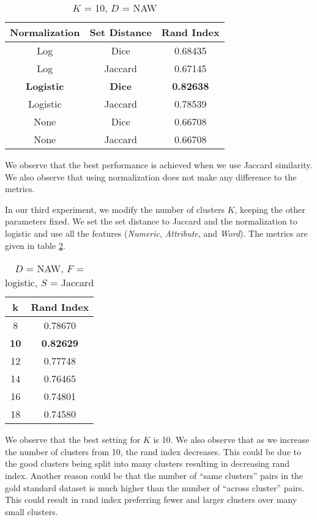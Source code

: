 \documentclass{article}
\begin{document}
\begin{table}
  \begin{center}
    \begin{tabular}{| c | c | c |}
    	\hline
       		Normalization & Set Distance & Rand Index \\
       	\hline
          Log & Dice & 0.68435 \\
          Log & Jaccard & 0.67145 \\
          \textbf{Logistic} & \textbf{Dice} & \textbf{0.82638} \\
          Logistic & Jaccard & 0.78539 \\
          None & Dice & 0.66708 \\
          None & Jaccard & 0.66708 \\
        \hline
    \end{tabular}
    \caption{$K$ = 10, $D$ = NAW}
    \label{tab:func}
  \end{center}
\end{table}

We observe that the best performance is achieved when we use Jaccard similarity.
We also observe that using normalization does not make any difference to the metrics.

In our third experiment, we modify the number of clusters $K$, keeping the other parameters fixed.
We set the set distance to Jaccard and the normalization to logistic and use all the features  (\textit{Numeric}, \textit{Attribute}, and \textit{Word}).
The metrics are given in table \ref{tab:cluster}. 
\begin{table}
  \begin{center}
    \begin{tabular}{| c | c |}
       \hline
       	 k & Rand Index \\
       \hline
         8 & 0.78670 \\
         \textbf{10} & \textbf{0.82629} \\
         12 & 0.77748 \\
         14 & 0.76465\\
         16 & 0.74801 \\
         18 & 0.74580 \\
       \hline
    \end{tabular}
    \caption{$D$ = NAW, $F$ = logistic, $S$ = Jaccard}
    \label{tab:cluster}
  \end{center}
\end{table}

We observe that the best setting for $K$ is 10.
We also observe that as we increase the number of clusters from 10, the rand index decreases.
This could be due to the good clusters being split into many clusters resulting in decreasing rand index.
Another reason could be that the number of ``same clusters'' pairs in the gold standard dataset is much higher than the number of ``across cluster'' pairs.
This could result in rand index preferring fewer and larger clusters over many small clusters.
\end{document}
